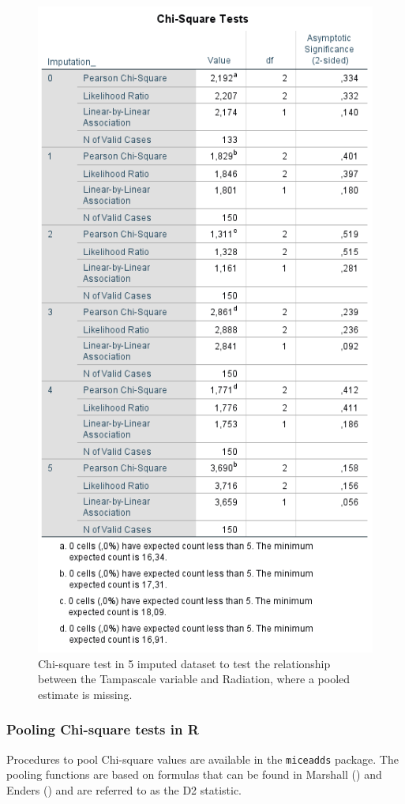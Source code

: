 \documentclass[]{book}
\begin{document}
\begin{figure}

{\centering \includegraphics[width=0.7\linewidth]{images/table5.6} 

}

\caption{Chi-square test in 5 imputed dataset to test the relationship between the Tampascale variable and Radiation, where a pooled estimate is missing.}\label{fig:tab5-6}
\end{figure}

\subsubsection{Pooling Chi-square tests in
R}\label{pooling-chi-square-tests-in-r}

Procedures to pool Chi-square values are available in the
\texttt{miceadds} package. The pooling functions are based on formulas
that can be found in Marshall (\citet{Marshall2009MedResMeth}) and
Enders (\citet{enders2010applied}) and are referred to as the D2
statistic.
\end{document}
